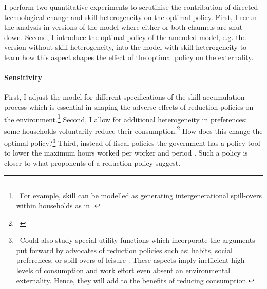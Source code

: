 I perform two quantitative experiments to scrutinise the contribution of directed technological change and skill heterogeneity on the optimal policy. First, I rerun the analysis in versions of the model where either or both channels are shut down.  Second, I introduce the optimal policy of the amended model, e.g. the  version without skill heterogeneity, into the model with skill heterogeneity to learn how this aspect shapes the effect of the optimal policy on the externality. %

\paragraph{Sensitivity}
First, I adjust the model for different specifications of the skill accumulation process which is essential in shaping the adverse effects of reduction policies on the environment.\footnote{\ For example, skill can be modelled as generating intergenerational spill-overs within households as in \cite{Borissov2019CarbonDevelopment}.} Second, I allow for additional heterogeneity in preferences: some households voluntarily reduce their consumption.\footnote{\ } How does this change the optimal policy?\footnote{\ Could also study special utility functions which incorporate the arguments put forward by advocates of reduction policies such as: habits, social preferences, or  spill-overs of leisure \citep[][\textit{to be read}]{Alesina2005WorkDifferent}. These aspects imply inefficient high levels of consumption and work effort even absent an environmental externality.  Hence, they will add to the benefits of reducing consumption. 
}
Third, instead of fiscal policies the government has a policy tool to lower the maximum hours worked per worker and period \citep[\textit{compare}][]{Alvarez-Cuadrado2007EnvyHours}. Such a policy is closer to what proponents of a reduction policy suggest. %
\\

\noindent\rule[1ex]{\textwidth}{1pt}


